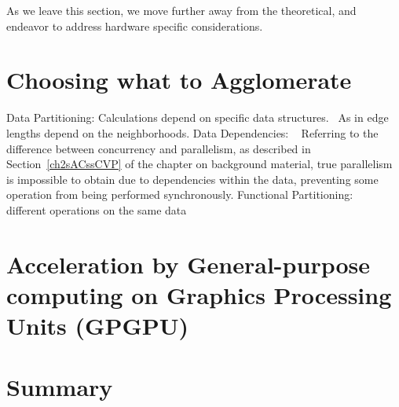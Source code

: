 As we leave this section, we move further away from the theoretical, and endeavor to address hardware specific considerations.

%
%
%
\section{Choosing what to Agglomerate}
%
Data Partitioning:
Calculations depend on specific data structures.~\cite[p.~357]{Lang17}
As in edge lengths depend on the neighborhoods.
%
Data Dependencies: ~\cite[p.~358]{Lang17}
Referring to the difference between concurrency and parallelism, as described in Section~\ref{ch2sACssCVP} of the chapter on background material, true parallelism is impossible to obtain due to dependencies within the data, preventing some operation from being performed synchronously.
%
Functional Partitioning: ~\cite[p.~359]{Lang17}
different operations on the same data

%
%
%
\section[Acceleration by GPGPU]{Acceleration by General-purpose
computing on Graphics Processing Units (GPGPU)}

%
%
%
\section{Summary}

